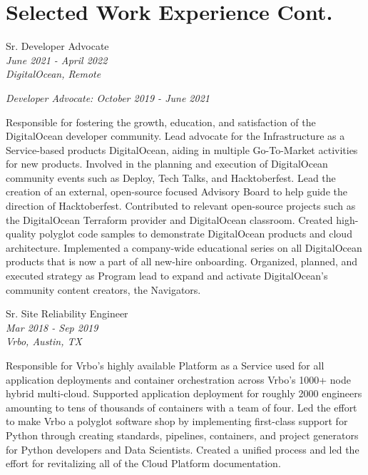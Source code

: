 \documentclass[10pt]{article} %
\begin{document}
\begin{minipage}[t]{0.5\textwidth} %
\vspace{0pt}  %
\section{Selected Work Experience Cont.} 


{\raggedright\large Sr. Developer Advocate\\
\small \textit{June 2021 - April 2022}\\
\small \textit{DigitalOcean, Remote} \\
\raggedright\small \textit{Developer Advocate: October 2019 - June 2021}\\[5pt]}

\normalsize{
    Responsible for fostering the growth, education, and satisfaction of the DigitalOcean developer community. Lead advocate for the Infrastructure as a Service-based products DigitalOcean, aiding in multiple Go-To-Market activities for new products. Involved in the planning and execution of DigitalOcean community events such as Deploy, Tech Talks, and Hacktoberfest. Lead the creation of an external, open-source focused Advisory Board to help guide the direction of Hacktoberfest. Contributed to relevant open-source projects such as the DigitalOcean Terraform provider and DigitalOcean classroom. Created high-quality polyglot code samples to demonstrate DigitalOcean products and cloud architecture. Implemented a company-wide educational series on all DigitalOcean products that is now a part of all new-hire onboarding. Organized, planned, and executed strategy as Program lead to expand and activate DigitalOcean's community content creators, the Navigators. \\
}

{\raggedright\large Sr. Site Reliability Engineer\\
\small \textit{Mar 2018 - Sep 2019}\\
\small \textit{Vrbo, Austin, TX} \\}

\normalsize{Responsible for Vrbo's highly available Platform as a Service used for all application deployments and container orchestration across Vrbo's 1000+ node hybrid multi-cloud. Supported application deployment for roughly 2000 engineers amounting to tens of thousands of containers with a team of four. Led the effort to make Vrbo a polyglot software shop by implementing first-class support for Python through creating standards, pipelines, containers, and project generators for Python developers and Data Scientists. Created a unified process and led the effort for revitalizing all of the Cloud Platform documentation. }\\


\end{minipage}
\end{document}

